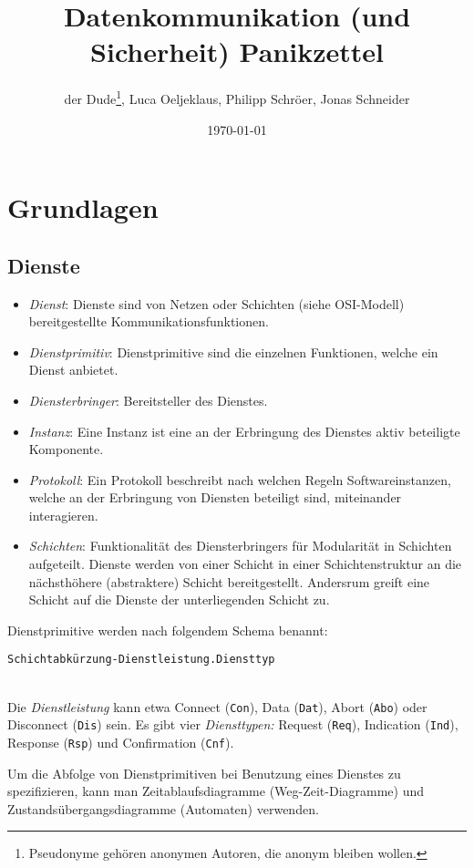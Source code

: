 \documentclass[a4paper,parskip=half*,DIV=15,fontsize=11pt]{scrartcl}
\title{Datenkommunikation (und Sicherheit) Panikzettel}
\author{der Dude\footnote{Pseudonyme gehören anonymen Autoren, die anonym bleiben wollen.}, Luca Oeljeklaus, Philipp Schröer, Jonas Schneider}
\date{\today}
\begin{document}
\maketitle

\tableofcontents

\section{Grundlagen}
\subsection{Dienste}
\begin{itemize}
    \item \emph{Dienst}: Dienste sind von Netzen oder Schichten (siehe OSI-Modell) bereitgestellte Kommunikationsfunktionen.
    \item \emph{Dienstprimitiv}: Dienstprimitive sind die einzelnen Funktionen, welche ein Dienst anbietet.
    \item \emph{Diensterbringer}: Bereitsteller des Dienstes.
    \item \emph{Instanz}: Eine Instanz ist eine an der Erbringung des Dienstes aktiv beteiligte Komponente.
    \item \emph{Protokoll}: Ein Protokoll beschreibt nach welchen Regeln Softwareinstanzen, welche an der Erbringung von Diensten beteiligt sind, miteinander interagieren.
    \item \emph{Schichten}: Funktionalität des Diensterbringers für Modularität in Schichten aufgeteilt. Dienste werden von einer Schicht in einer Schichtenstruktur an die nächsthöhere (abstraktere) Schicht bereitgestellt. Andersrum greift eine Schicht auf die Dienste der unterliegenden Schicht zu.
\end{itemize}

Dienstprimitive werden nach folgendem Schema benannt:\\
\centerline{\lstinline{Schichtabkürzung-Dienstleistung.Diensttyp}} \\
Die \emph{Dienstleistung} kann etwa Connect (\lstinline{Con}), Data (\lstinline{Dat}), Abort (\lstinline{Abo}) oder Disconnect (\lstinline{Dis}) sein. Es gibt vier \emph{Diensttypen:} Request (\lstinline{Req}), Indication (\lstinline{Ind}), Response (\lstinline{Rsp}) und Confirmation (\lstinline{Cnf}).

Um die Abfolge von Dienstprimitiven bei Benutzung eines Dienstes zu spezifizieren, kann man Zeitablaufsdiagramme (Weg-Zeit-Diagramme) und Zustandsübergangsdiagramme (Automaten) verwenden.
\end{document}
